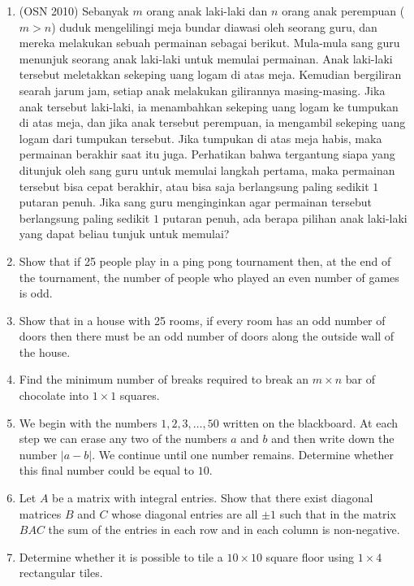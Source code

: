 \documentclass[12pt]{scrartcl}
\begin{document}
\begin{enumerate}
\item (OSN 2010) Sebanyak $m$ orang anak laki-laki dan $n$ orang anak perempuan ($m > n$) duduk mengelilingi meja bundar diawasi oleh seorang guru, dan mereka melakukan sebuah permainan sebagai berikut. Mula-mula sang guru menunjuk seorang anak laki-laki untuk memulai permainan. Anak laki-laki tersebut meletakkan sekeping uang logam di atas meja. Kemudian bergiliran searah jarum jam, setiap anak melakukan gilirannya masing-masing. Jika anak tersebut laki-laki, ia menambahkan sekeping uang logam ke tumpukan di atas meja, dan jika anak tersebut perempuan, ia mengambil sekeping uang logam dari tumpukan tersebut. Jika tumpukan di atas meja habis, maka permainan berakhir saat itu juga. Perhatikan bahwa tergantung siapa yang ditunjuk oleh sang guru untuk memulai langkah pertama, maka permainan tersebut bisa cepat berakhir, atau bisa saja berlangsung paling sedikit $1$ putaran penuh.
Jika sang guru menginginkan agar permainan tersebut berlangsung paling sedikit $1$ putaran penuh, ada berapa pilihan anak laki-laki yang dapat beliau tunjuk untuk memulai?

\item Show that if 25 people play in a ping pong tournament then, at the end of the tournament, the number of people who played an even number of games is odd.

\item Show that in a house with 25 rooms, if every room has an odd number of doors then there must be an odd number of doors along the outside wall of the house.

\item Find the minimum number of breaks required to break an $m \times n$ bar of chocolate into $1 \times 1$ squares.

\item We begin with the numbers $1, 2, 3, \ldots , 50$ written on the blackboard. At each step we can erase any two of the numbers $a$ and $b$ and then write down the number $|a-b|$. We continue until one number remains. Determine whether this final number could be equal to $10$.

\item Let $A$ be a matrix with integral entries. Show that there exist diagonal matrices $B$ and $C$ whose diagonal entries are all $\pm1$ such that in the matrix $BAC$ the sum of the entries in each row and in each column is non-negative.

\item Determine whether it is possible to tile a $10 \times 10$ square floor using $1 \times 4$ rectangular tiles.


\end{enumerate}
\end{document}
